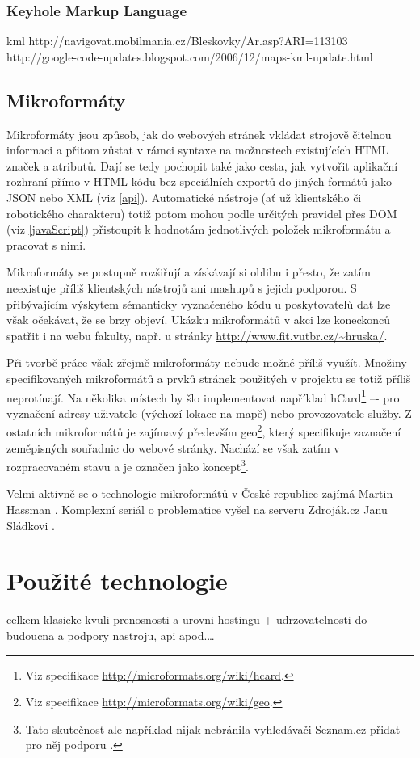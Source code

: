 \subsection{Keyhole Markup Language}
kml
http://navigovat.mobilmania.cz/Bleskovky/Ar.asp?ARI=113103
http://google-code-updates.blogspot.com/2006/12/maps-kml-update.html

\section{Mikroformáty}
Mikroformáty jsou způsob, jak do webových stránek vkládat strojově
čitelnou informaci a přitom zůstat v rámci syntaxe na možnostech
existujících HTML značek a atributů. Dají se tedy pochopit také jako
cesta, jak vytvořit aplikační rozhraní přímo v HTML kódu bez
speciálních exportů do jiných formátů jako JSON nebo XML (viz
\ref{api}). Automatické nástroje (ať už klientského či robotického
charakteru) totiž potom mohou podle určitých pravidel přes DOM (viz
\ref{javaScript}) přistoupit k hodnotám jednotlivých položek
mikroformátu a pracovat s nimi.

Mikroformáty se postupně rozšiřují a získávají si oblibu i přesto, že
zatím neexistuje příliš klientských nástrojů ani mashupů s jejich
podporou. S přibývajícím výskytem sémanticky vyznačeného kódu u
poskytovatelů dat lze však očekávat, že se brzy objeví. Ukázku
mikroformátů v akci lze koneckonců spatřit i na webu
fakulty, např. u stránky \url{http://www.fit.vutbr.cz/~hruska/}.

Při tvorbě práce však zřejmě mikroformáty nebude možné příliš využít.
Množiny specifikovaných mikroformátů a prvků stránek použitých v
projektu se totiž příliš neprotínají. Na několika místech by šlo
implementovat například
hCard\footnote{Viz
specifikace \url{http://microformats.org/wiki/hcard}.} –- pro
vyznačení adresy uživatele (výchozí lokace na mapě) nebo provozovatele služby. Z ostatních mikroformátů je zajímavý především
geo\footnote{Viz specifikace \url{http://microformats.org/wiki/geo}.},
který specifikuje zaznačení zeměpisných souřadnic do webové stránky.
Nachází se však zatím v rozpracovaném stavu a je označen jako
koncept\footnote{Tato skutečnost ale například nijak nebránila vyhledávači Seznam.cz
přidat pro něj podporu \cite{geoSeznam}.}.

Velmi aktivně se o technologie mikroformátů v České republice zajímá
Martin Hassman \cite{mfLupa}. Komplexní seriál o problematice vyšel
na serveru Zdroják.cz Janu Sládkovi \cite{mf}.

\chapter{Použité technologie}
celkem klasicke kvuli prenosnosti a urovni hostingu +
udrzovatelnosti do budoucna a podpory nastroju, api apod.\ldots

